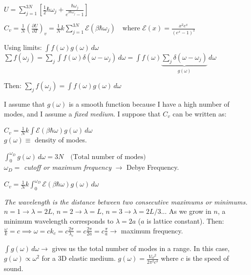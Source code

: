 \documentclass[12pt,a4paper]{report}
\newcommand{\esp}{\vspace{0.5cm}}
\begin{document}
	\esp
	
	$U = \sum_{j=1}^{3N} \left[ \frac{1}{2}\hbar\omega_j + \frac{\hbar\omega_j}{e^{\beta\hbar\omega_j}-1} \right]$
	
	\esp
	
	$C_v = \frac{1}{N} \left( \frac{\partial U}{\partial T} \right)_v = \frac{1}{N} k \sum_{j=1}^{3N} \mathcal{E}(\beta\hbar\omega_j) \quad \text{where } \mathcal{E}(x) = \frac{x^2 e^x}{(e^x-1)^2}$
	
	\esp
	
	Using limits: $\int f(\omega) g(\omega) \, d\omega$ \\
	$\sum f(\omega_j) = \sum_j \int f(\omega) \delta(\omega - \omega_j) \, d\omega = \int f(\omega) \underbrace{\sum_j \delta(\omega - \omega_j)}_{g(\omega)} \, d\omega$
	
	\esp
	
	Then: $\sum_j f(\omega_j) = \int f(\omega) g(\omega) \, d\omega$
	
	\esp
	
	I assume that $g(\omega)$ is a smooth function because I have a high number of modes, and I assume a \textit{fixed medium}. I suppose that $C_v$ can be written as:
	
	\esp
	
	$C_v = \frac{1}{N} k \int \mathcal{E}(\beta\hbar\omega) g(\omega) \, d\omega$ \\
	$g(\omega) \equiv$ density of modes.
	
	\esp
	
	$\int_0^{\omega_D} g(\omega) \, d\omega = 3N \quad \text{(Total number of modes)}$ \\
	$\omega_D = $ \textit{cutoff or maximum frequency} $\to$ Debye Frequency.
	
	\esp
	
	$C_v = \frac{1}{N} k \int_0^{\omega_D} \mathcal{E}(\beta\hbar\omega) g(\omega) \, d\omega$
	
	\esp
	
	\textit{The wavelength is the distance between two consecutive maximums or minimums.}
	$n=1 \to \lambda = 2L$, $n=2 \to \lambda = L$, $n=3 \to \lambda = 2L/3$...
	As we grow in $n$, a minimum wavelength corresponds to $\lambda = 2a$ ($a$ is lattice constant).
	Then: $\frac{\omega}{k} = c \implies \omega = c k_c = c \frac{2\pi}{\lambda_c} = c \frac{2\pi}{2a} = c \frac{\pi}{a} \to$ maximum frequency.
	
	\esp
	
	$\int g(\omega) \, d\omega \to$ gives us the total number of modes in a range.
	In this case, $g(\omega) \propto \omega^2$ for a 3D elastic medium.
	$g(\omega) = \frac{V \omega^2}{2\pi^2 c^3}$ where $c$ is the speed of sound.
	
\end{document}
